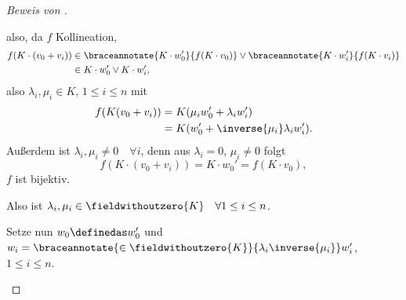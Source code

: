 \begin{proof}[Beweis von ]
\begin{subproof}
\begin{equation*}
    \end{equation*}
    also, da \( f \) Kollineation,
    \begin{align*}
      f(K\cdot (v_0+v_i))&\in \braceannotate{K\cdot w_0'}{f(K\cdot v_0)}\vee \braceannotate{K\cdot w_i'}{f(K\cdot v_i)}\\
      &\in K\cdot w_0'\vee K\cdot w_i', 
    \end{align*}
    also \texists \( \lambda_i,\mu_i\in K \), \( 1\leq i \leq n \) mit
    \begin{align*}
      f(K(v_0+v_i))&=K(\mu_i w_0'+\lambda_i w_i')\\
      &=K(w_0'+\inverse{\mu_i}\lambda_i w_i').
    \end{align*}
    Außerdem ist \( \lambda_i,\mu_i\neq 0\quad \forall i \), denn aus \( \lambda_i=0 \), \( \mu_i\neq 0 \) folgt \zb
    \begin{equation*}
      f(K\cdot(v_0+v_i))=K\cdot w_0'=f(K\cdot v_0),
    \end{equation*}
    \contra \( f \) ist bijektiv.

    Also ist \( \lambda_i, \mu_i\in \fieldwithoutzero{K}\quad \forall 1\leq i\leq n \).

    Setze nun \( w_0\definedas w_0' \) und \( w_i=\braceannotate{\in \fieldwithoutzero{K}}{\lambda_i \inverse{\mu_i}}w_i' \), \( 1\leq i\leq n \).
    

\end{subproof}
\end{proof}
